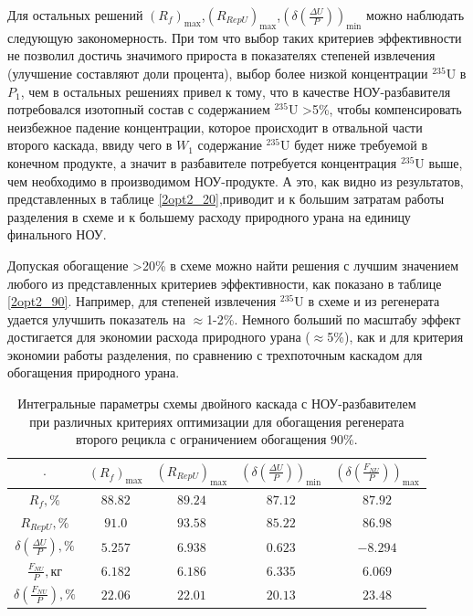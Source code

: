 Для остальных решений $(R_{f})_\text{max}$,$(R_{RepU})_\text{max}$,$(\delta(\frac{\Delta U}{P}))_\text{min}$ можно наблюдать следующую закономерность. При том что выбор таких критериев эффективности не позволил достичь значимого прироста в показателях степеней извлечения (улучшение составляют доли процента), выбор более низкой концентрации $^{235}$U в $P_{1}$, чем в остальных решениях привел к тому, что в качестве НОУ-разбавителя потребовался изотопный состав с содержанием $^{235}$U >5\%, чтобы компенсировать неизбежное падение концентрации, которое происходит в отвальной части второго каскада, ввиду чего в $W_{1}$ содержание $^{235}$U будет ниже требуемой в конечном продукте, а значит в разбавителе потребуется концентрация $^{235}$U выше, чем необходимо в производимом НОУ-продукте. А это, как видно из результатов, представленных в таблице \ref{2opt2_20},приводит и к большим затратам работы разделения в схеме и к большему расходу природного урана на единицу финального НОУ. 




Допуская обогащение >20\% в схеме можно найти решения с лучшим значением любого из представленных критериев эффективности, как показано в таблице \ref{2opt2_90}. Например, для степеней извлечения $^{235}$U в схеме и из регенерата удается улучшить показатель на $\approx$1-2\%. Немного больший по масштабу эффект достигается для экономии расхода природного урана ($\approx$5\%), как и для критерия экономии работы разделения, по сравнению с трехпоточным каскадом для обогащения природного урана.

\begin{table}
    \begin{tabular}{ccccc}
        $\cdot$ & $(R_f)_\text{max}$ & $(R_{RepU})_\text{max}$ & $(\delta(\frac{\Delta U}{P}))_\text{min}$ & $(\delta(\frac{F_{NU}}{P}))_\text{max}$\\ \hline
        $R_f, \%$ & $88.82$ & $89.24$ & $87.12$ & $87.92$\\ \hline
        $R_{RepU}, \%$ & $91.0$ & $93.58$ & $85.22$ & $86.98$\\ \hline
        $\delta(\frac{\Delta U}{P}), \%$ & $5.257$ & $6.938$ & $0.623$ & $-8.294$\\ \hline
        $\frac{F_{NU}}{P}, \text{кг}$ & $6.182$ & $6.186$ & $6.335$ & $6.069$\\ \hline
        $\delta(\frac{F_{NU}}{P}), \%$ & $22.06$ & $22.01$ & $20.13$ & $23.48$
    \end{tabular}
    \caption{Интегральные параметры схемы двойного каскада с НОУ-разбавителем при различных критериях оптимизации для обогащения регенерата второго рецикла с ограничением обогащения 90\%.{\label{2opt2_90_int}}}
\end{table}

